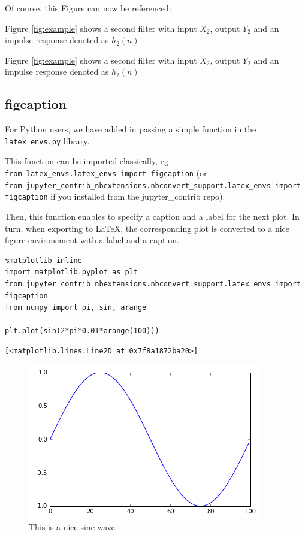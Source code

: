 Of course, this Figure can now be referenced:

\begin{listing}
Figure \ref{fig:example} shows a second filter with input $X_2$, output $Y_2$  and an impulse response denoted as $h_2(n)$
\end{listing}

Figure \ref{fig:example} shows a second filter with input \(X_2\),
output \(Y_2\) and an impulse response denoted as \(h_2(n)\)

    \subsection{figcaption}\label{figcaption}

    For Python users, we have added in passing a simple function in the
\texttt{latex\_envs.py} library.

This function can be imported classically, eg
\texttt{from\ latex\_envs.latex\_envs\ import\ figcaption} (or
\texttt{from\ jupyter\_contrib\_nbextensions.nbconvert\_support.latex\_envs\ import\ figcaption}
if you installed from the jupyter\_contrib repo).

Then, this function enables to specify a caption and a label for the
next plot. In turn, when exporting to \LaTeX, the corresponding plot is
converted to a nice figure environement with a label and a caption.
%
\begin{lstlisting}
%matplotlib inline
import matplotlib.pyplot as plt
from jupyter_contrib_nbextensions.nbconvert_support.latex_envs import figcaption
from numpy import pi, sin, arange

plt.plot(sin(2*pi*0.01*arange(100)))
\end{lstlisting}%
    
    

    
    
    
    \begin{verbatim}
[<matplotlib.lines.Line2D at 0x7f8a1872ba20>]
    \end{verbatim}

    

    
\begin{figure}[H]
\centering
\includegraphics[width=0.6\linewidth]{latex_env_doc_files/latex_env_doc_23_2.png}
\caption{This is a nice sine wave}
\label{fig:mysin}
\end{figure}
    
